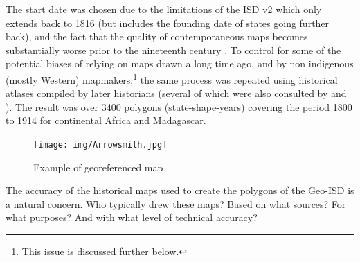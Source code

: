 \documentclass[12pt]{article}
\begin{document}
The start date was chosen due to the limitations of the ISD v2 which only extends
back to 1816 (but includes the founding date of states going further back), and
the fact that the quality of contemporaneous maps becomes substantially worse
prior to the nineteenth century \citep{Bassett_1994}. To control for some of the
potential biases of relying on maps drawn a long time ago, and by non indigenous
(mostly Western) mapmakers,\footnote{This issue is discussed further below.} the
same process was repeated using historical atlases compiled by later historians
(several of which were also consulted by \citet{Depetris-Chauvin2016} and
\citet{Paine2019}). The result was over 3400 polygons (state-shape-years)
covering the period 1800 to 1914 for continental Africa and Madagascar. 


\begin{figure}[h!tpb]
	\centering
	\texttt{[image: img/Arrowsmith.jpg]}
	\caption{Example of georeferenced map}%
	\label{Arrowsmith}
\end{figure}


The accuracy of the historical maps used to create the polygons of the Geo-ISD
is a natural concern. Who typically drew these maps? Based on what sources? For
what purposes? And with what level of technical accuracy? 
\end{document}

